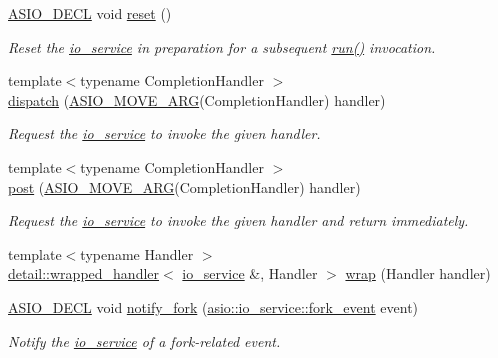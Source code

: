 \begin{DoxyCompactItemize}
\hyperlink{config_8hpp_ab54d01ea04afeb9a8b39cfac467656b7}{A\+S\+I\+O\+\_\+\+D\+E\+C\+L} void \hyperlink{classasio_1_1io__service_a28a4283881eba54d415409ad604384f8}{reset} ()
\begin{DoxyCompactList}\small\item\em Reset the \hyperlink{classasio_1_1io__service}{io\+\_\+service} in preparation for a subsequent \hyperlink{classasio_1_1io__service_ac84bed0d1dd061bc71010ba1228439da}{run()} invocation. \end{DoxyCompactList}\item 
{\footnotesize template$<$typename Completion\+Handler $>$ }\\\hyperlink{classasio_1_1io__service_a1afb0747af56d0c13006c97713d08759}{dispatch} (\hyperlink{group__async__read_ga6d72a97784dde9476c6d93b8904a4967}{A\+S\+I\+O\+\_\+\+M\+O\+V\+E\+\_\+\+A\+R\+G}(Completion\+Handler) handler)
\begin{DoxyCompactList}\small\item\em Request the \hyperlink{classasio_1_1io__service}{io\+\_\+service} to invoke the given handler. \end{DoxyCompactList}\item 
{\footnotesize template$<$typename Completion\+Handler $>$ }\\\hyperlink{classasio_1_1io__service_ae01f809800017295e39786f5bca6652e}{post} (\hyperlink{group__async__read_ga6d72a97784dde9476c6d93b8904a4967}{A\+S\+I\+O\+\_\+\+M\+O\+V\+E\+\_\+\+A\+R\+G}(Completion\+Handler) handler)
\begin{DoxyCompactList}\small\item\em Request the \hyperlink{classasio_1_1io__service}{io\+\_\+service} to invoke the given handler and return immediately. \end{DoxyCompactList}\item 
{\footnotesize template$<$typename Handler $>$ }\\\hyperlink{classasio_1_1detail_1_1wrapped__handler}{detail\+::wrapped\+\_\+handler}$<$ \hyperlink{classasio_1_1io__service}{io\+\_\+service} \&, Handler $>$ \hyperlink{classasio_1_1io__service_ae7a2ad07b39801135aa389c71bf44cbe}{wrap} (Handler handler)
\item 
\hyperlink{config_8hpp_ab54d01ea04afeb9a8b39cfac467656b7}{A\+S\+I\+O\+\_\+\+D\+E\+C\+L} void \hyperlink{classasio_1_1io__service_af1e9678ed8a80730fa86ad92225e0999}{notify\+\_\+fork} (\hyperlink{classasio_1_1io__service_a45f084ae64e601f7ead3f891d5ed0fc6}{asio\+::io\+\_\+service\+::fork\+\_\+event} event)
\begin{DoxyCompactList}\small\item\em Notify the \hyperlink{classasio_1_1io__service}{io\+\_\+service} of a fork-\/related event. \end{DoxyCompactList}\end{DoxyCompactItemize}

